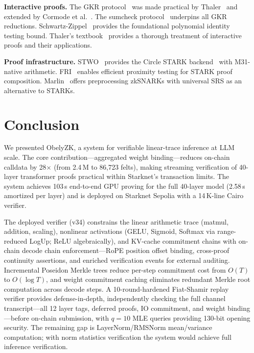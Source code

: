 \documentclass[10pt,twocolumn]{article}
\theoremstyle{definition}
\theoremstyle{remark}
\begin{document}
\textbf{Interactive proofs.}
The GKR protocol~\cite{goldwasser2015delegating} was made practical
by Thaler~\cite{thaler2013time} and extended by Cormode et
al.~\cite{cormode2012practical}.
The sumcheck protocol~\cite{lund1992algebraic} underpins all GKR
reductions.
Schwartz-Zippel~\cite{schwartz1980, zippel1979} provides the
foundational polynomial identity testing bound.
Thaler's textbook~\cite{thaler2022proofs} provides a thorough treatment
of interactive proofs and their applications.

\textbf{Proof infrastructure.}
STWO~\cite{starkware2024stwo} provides the Circle STARK
backend~\cite{habock2024circle} with M31-native arithmetic.
FRI~\cite{ben-sasson2018fri} enables efficient proximity testing
for STARK proof composition.
Marlin~\cite{chiesa2020marlin} offers preprocessing zkSNARKs with
universal SRS as an alternative to STARKs.


\section{Conclusion}\label{sec:conclusion}

We presented ObelyZK, a system for verifiable linear-trace inference
at LLM scale.
The core contribution---aggregated weight binding---reduces on-chain
calldata by 28$\times$ (from 2.4\,M to 86{,}723 felts), making
streaming verification of 40-layer transformer proofs practical within
Starknet's transaction limits.
The system achieves 103\,s end-to-end GPU proving for the full 40-layer
model (2.58\,s amortized per layer) and is deployed on
Starknet Sepolia with a 14\,K-line Cairo verifier.

The deployed verifier (v34) constrains the linear arithmetic trace
(matmul, addition, scaling), nonlinear activations (GELU,
Sigmoid, Softmax via range-reduced LogUp; ReLU algebraically),
and KV-cache commitment chains with on-chain decode chain
enforcement---RoPE position offset binding, cross-proof continuity
assertions, and enriched verification events for external auditing.
Incremental Poseidon Merkle trees reduce per-step commitment cost
from $O(T)$ to $O(\log T)$, and weight commitment caching
eliminates redundant Merkle root computation across decode steps.
A 10-round-hardened Fiat-Shamir replay verifier provides
defense-in-depth, independently checking the full channel
transcript---all 12 layer tags, deferred proofs, IO commitment,
and weight binding---before on-chain submission, with $q\!=\!10$
MLE queries providing 130-bit opening security.
The remaining gap is LayerNorm/RMSNorm mean/variance computation;
with norm statistics verification the system would achieve
full inference verification.
\end{document}
